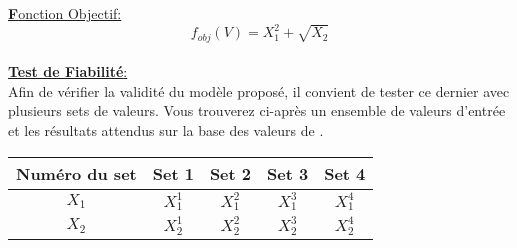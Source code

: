 \documentclass[a4paper,12pt]{article}
\begin{document}
\underline{\textbf Fonction Objectif:}\\
\[ f_{obj}(V) = X_{1}^{2} + \sqrt{X_{2}} \]\\

\large{\underline{\textbf{Test de Fiabilité}:}}\\

\normalsize
Afin de vérifier la validité du modèle proposé, il convient de tester ce dernier avec plusieurs sets de valeurs. Vous trouverez ci-après un ensemble de valeurs d'entrée et les résultats attendus sur la base des valeurs de \cite{Doc1}.\\

\begin{center}
\begin{tabular}{|c|c|c|c|c|}
 \hline
 Numéro du set & Set 1 & Set 2 & Set 3 & Set 4\\
 \hline
 $ X_{1} $ & $ X_{1}^{1} $ & $ X_{1}^{2} $ & $ X_{1}^{3} $ & $ X_{1}^{4} $ \\
 \hline
 $ X_{2} $ & $ X_{2}^{1} $ & $ X_{2}^{2} $ & $ X_{2}^{3} $ & $ X_{2}^{4} $ \\
 \hline
\end{tabular}
\end{center}




\end{document}
